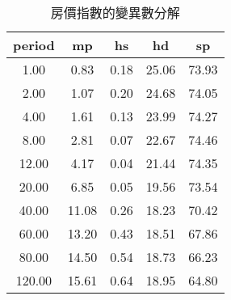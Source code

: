 \begin{table}[h]
\centering
\begin{tabular}{|c|c|c|c|c}
  \hline
period & mp & hs & hd & sp \\ 
  \hline
1.00 & 0.83 & 0.18 & 25.06 & 73.93 \\ 
   \hline
2.00 & 1.07 & 0.20 & 24.68 & 74.05 \\ 
   \hline
4.00 & 1.61 & 0.13 & 23.99 & 74.27 \\ 
   \hline
8.00 & 2.81 & 0.07 & 22.67 & 74.46 \\ 
   \hline
12.00 & 4.17 & 0.04 & 21.44 & 74.35 \\ 
   \hline
20.00 & 6.85 & 0.05 & 19.56 & 73.54 \\ 
   \hline
40.00 & 11.08 & 0.26 & 18.23 & 70.42 \\ 
   \hline
60.00 & 13.20 & 0.43 & 18.51 & 67.86 \\ 
   \hline
80.00 & 14.50 & 0.54 & 18.73 & 66.23 \\ 
   \hline
120.00 & 15.61 & 0.64 & 18.95 & 64.80 \\ 
   \hline
\end{tabular}
\caption{房價指數的變異數分解} 
\end{table}
